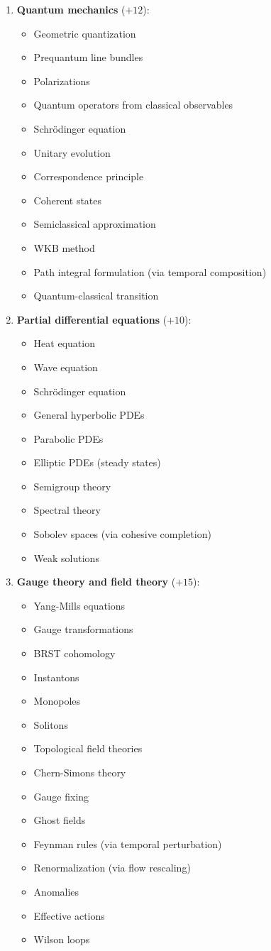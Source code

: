 \documentclass[11pt]{article}
\theoremstyle{definition}
\begin{document}
\begin{enumerate}[leftmargin=*]
\item \textbf{Quantum mechanics} ($+12$):
\begin{itemize}
\item Geometric quantization
\item Prequantum line bundles
\item Polarizations
\item Quantum operators from classical observables
\item Schrödinger equation
\item Unitary evolution
\item Correspondence principle
\item Coherent states
\item Semiclassical approximation
\item WKB method
\item Path integral formulation (via temporal composition)
\item Quantum-classical transition
\end{itemize}

\item \textbf{Partial differential equations} ($+10$):
\begin{itemize}
\item Heat equation
\item Wave equation
\item Schrödinger equation
\item General hyperbolic PDEs
\item Parabolic PDEs
\item Elliptic PDEs (steady states)
\item Semigroup theory
\item Spectral theory
\item Sobolev spaces (via cohesive completion)
\item Weak solutions
\end{itemize}

\item \textbf{Gauge theory and field theory} ($+15$):
\begin{itemize}
\item Yang-Mills equations
\item Gauge transformations
\item BRST cohomology
\item Instantons
\item Monopoles
\item Solitons
\item Topological field theories
\item Chern-Simons theory
\item Gauge fixing
\item Ghost fields
\item Feynman rules (via temporal perturbation)
\item Renormalization (via flow rescaling)
\item Anomalies
\item Effective actions
\item Wilson loops
\end{itemize}


\end{enumerate}
\end{document}
